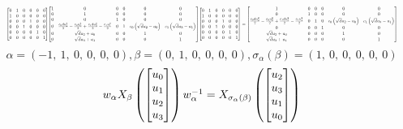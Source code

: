 \documentclass[11pt]{article}
\theoremstyle{definition}
\begin{document}
\[
\scaletoalign{\textwidth}{{\left[\begin{matrix}0 & 1 & 0 & 0 & 0 & 0\\1 & 0 & 0 & 0 & 0 & 0\\0 & 0 & 0 & 1 & 0 & 0\\0 & 0 & 1 & 0 & 0 & 0\\0 & 0 & 0 & 0 & 1 & 0\\0 & 0 & 0 & 0 & 0 & 1\end{matrix}\right]} {\left[\begin{matrix}1 & 0 & 0 & 0 & 0 & 0\\0 & 1 & 0 & 0 & 0 & 0\\0 & 0 & 1 & 0 & 0 & 0\\0 & \frac{c_{0} d u_{2}^{2}}{2} - \frac{c_{0} u_{0}^{2}}{2} + \frac{c_{1} d u_{3}^{2}}{2} - \frac{c_{1} u_{1}^{2}}{2} & 0 & 1 & c_{0} \left(\sqrt{d} u_{2} - u_{0}\right) & c_{1} \left(\sqrt{d} u_{3} - u_{1}\right)\\0 & \sqrt{d} u_{2} + u_{0} & 0 & 0 & 1 & 0\\0 & \sqrt{d} u_{3} + u_{1} & 0 & 0 & 0 & 1\end{matrix}\right]} {\left[\begin{matrix}0 & 1 & 0 & 0 & 0 & 0\\1 & 0 & 0 & 0 & 0 & 0\\0 & 0 & 0 & 1 & 0 & 0\\0 & 0 & 1 & 0 & 0 & 0\\0 & 0 & 0 & 0 & 1 & 0\\0 & 0 & 0 & 0 & 0 & 1\end{matrix}\right]} = {\left[\begin{matrix}1 & 0 & 0 & 0 & 0 & 0\\0 & 1 & 0 & 0 & 0 & 0\\\frac{c_{0} d u_{2}^{2}}{2} - \frac{c_{0} u_{0}^{2}}{2} + \frac{c_{1} d u_{3}^{2}}{2} - \frac{c_{1} u_{1}^{2}}{2} & 0 & 1 & 0 & c_{0} \left(\sqrt{d} u_{2} - u_{0}\right) & c_{1} \left(\sqrt{d} u_{3} - u_{1}\right)\\0 & 0 & 0 & 1 & 0 & 0\\\sqrt{d} u_{2} + u_{0} & 0 & 0 & 0 & 1 & 0\\\sqrt{d} u_{3} + u_{1} & 0 & 0 & 0 & 0 & 1\end{matrix}\right]}}
\]
\[
\alpha = \left( -1, \  1, \  0, \  0, \  0, \  0\right), \beta = \left( 0, \  1, \  0, \  0, \  0, \  0\right), \sigma_{\alpha}(\beta) = \left( 1, \  0, \  0, \  0, \  0, \  0\right)
\]
\[
\scaletoalign{\textwidth}{w_{\alpha} X_{\beta}\left(\left[\begin{matrix}u_{0}\\u_{1}\\u_{2}\\u_{3}\end{matrix}\right]\right) w_{\alpha}^{-1} = X_{\sigma_{\alpha}\left(\beta\right)}\left(\left[\begin{matrix}u_{2}\\u_{3}\\u_{1}\\u_{0}\end{matrix}\right]\right)}
\]
\end{document}

